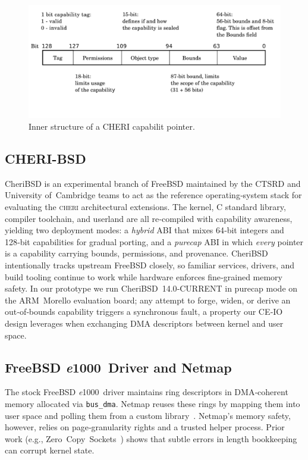 \documentclass[sigconf]{acmart}
\newcommand{\cheri}{\textsc{cheri}\xspace}
\newcommand{\e}{\textit{e}1000\xspace}
\begin{document}
\begin{figure}[t]
    \centering
    \includegraphics[width=0.9\columnwidth]{figures/cheri-3-1024x460.png}
    \caption{Inner structure of a CHERI capabilit pointer.}
    \label{fig:capability}
\end{figure}

\subsection{CHERI-BSD}
CheriBSD is an experimental branch of FreeBSD maintained by the CTSRD and University of Cambridge teams to act as the reference operating‑system stack for evaluating the \cheri architectural extensions. The kernel, C standard library, compiler toolchain, and userland are all re‑compiled with capability awareness, yielding two deployment modes: a \emph{hybrid} ABI that mixes 64‑bit integers and 128‑bit capabilities for gradual porting, and a \emph{purecap} ABI in which \emph{every} pointer is a capability carrying bounds, permissions, and provenance. CheriBSD intentionally tracks upstream FreeBSD closely, so familiar services, drivers, and build tooling continue to work while hardware enforces fine‑grained memory safety. In our prototype we run CheriBSD 14.0‑CURRENT in purecap mode on the ARM Morello evaluation board; any attempt to forge, widen, or derive an out‑of‑bounds capability triggers a synchronous fault, a property our CE‑IO design leverages when exchanging DMA descriptors between kernel and user space.

\subsection{FreeBSD \e Driver and Netmap}
The stock FreeBSD \e driver maintains ring descriptors in DMA‑coherent memory allocated via \texttt{bus\_dma}. Netmap reuses these rings by mapping them into user space and polling them from a custom library \cite{rizzo2012netmap}. Netmap’s memory safety, however, relies on page‑granularity rights and a trusted helper process. Prior work (e.g., Zero Copy Sockets \cite{freebsdZC}) shows that subtle errors in length bookkeeping can corrupt kernel state.  
\end{document}
